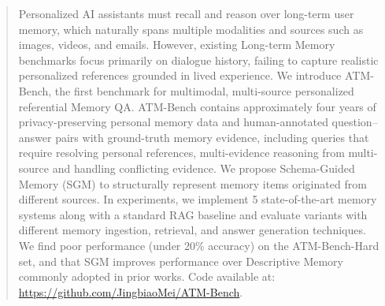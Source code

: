 \documentclass{article}
\theoremstyle{plain}
\theoremstyle{definition}
\theoremstyle{remark}
\begin{document}
\begin{abstract}

Personalized AI assistants must recall and reason over long-term user memory, which naturally spans multiple modalities and sources such as images, videos, and emails. However, existing Long-term Memory benchmarks focus primarily on dialogue history, failing to capture realistic personalized references grounded in lived experience. We introduce ATM-Bench, the first benchmark for multimodal, multi-source personalized referential Memory QA. ATM-Bench contains approximately four years of privacy-preserving personal memory data and human-annotated question–answer pairs with ground-truth memory evidence, including queries that require resolving personal references, multi-evidence reasoning from multi-source and handling conflicting evidence. We propose Schema-Guided Memory (SGM) to structurally represent memory items originated from different sources. %
In experiments, we implement 5 state-of-the-art memory systems along with a standard RAG baseline and evaluate variants with different memory ingestion, retrieval, and answer generation techniques. We find poor performance (under 20\% accuracy) on the ATM-Bench-Hard set, and that SGM improves performance over Descriptive Memory commonly adopted in prior works. Code available at: \href{https://github.com/JingbiaoMei/ATM-Bench}{https://github.com/JingbiaoMei/ATM-Bench}.

\end{abstract}
\end{document}
